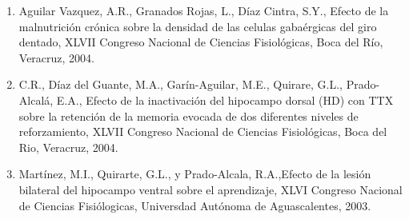 \begin{enumerate}
\item Aguilar Vazquez, A.R., Granados Rojas, L., Díaz Cintra, S.Y., Efecto de la malnutrición crónica sobre la densidad de las celulas 
gabaérgicas 
del giro dentado, XLVII Congreso Nacional de Ciencias Fisiológicas, Boca del Río, Veracruz, 2004.

\item C.R., Díaz del Guante, M.A., Garín-Aguilar, M.E., Quirare, G.L., Prado-Alcalá, E.A., Efecto de la inactivación del hipocampo dorsal 
(HD) con 
TTX sobre la retención de la memoria evocada de dos diferentes niveles de reforzamiento, XLVII Congreso Nacional de Ciencias Fisiológicas, 
Boca del Rio, Veracruz, 2004.

\item Martínez, M.I., Quirarte, G.L., y Prado-Alcala, R.A.,Efecto de la lesión bilateral del hipocampo ventral sobre el aprendizaje, XLVI 
Congreso 
Nacional de Ciencias Fisiólogicas, Universdad Autónoma de Aguascalentes, 2003.

\end{enumerate}

